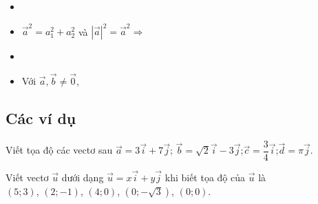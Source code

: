 \begin{itemize}
	\item {}
	\item $\overrightarrow{a}^2 = a_1^2 + a_2^2$ và $|\vec{a}|^2=\vec{a}^2 \Rightarrow$ 
	\item {}
	\item Với $\vec{a}, \vec{b} \ne \vec{0}$, 
\end{itemize}
\subsection{Các ví dụ}
\begin{vd}%
	Viết tọa độ các vectơ sau
	$\vec{a}=3\vec{i}+7\vec{j}$; \quad $\vec{b}=\sqrt{2}\vec{i}-3\vec{j}$;\quad $\vec{c}=\dfrac{3}{4}\vec{i}$;\quad$\vec{d}=\pi\vec{j}$.
\end{vd}
\begin{vd}%
	Viết vectơ $\vec{u}$ dưới dạng $\vec{u}=x\vec{i}+y\vec{j}$ khi biết tọa độ của $\vec{u}$ là\\
	$(5;3)$, $(2;-1)$, $(4;0)$, $\left(0;-\sqrt{3}\right)$, $(0;0)$.
\end{vd}
